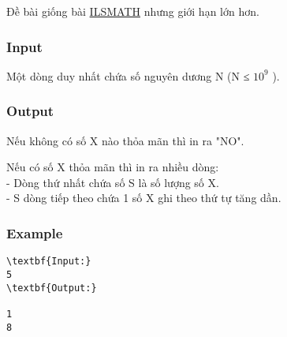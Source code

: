 

Đề bài giống bài \href{http://vnoi.info/problems/show/ILSMATH/}{ILSMATH} nhưng giới hạn lớn hơn.

\subsubsection{Input}

Một dòng duy nhất chứa số nguyên dương N (N ≤ $10^{9}$ ).

\subsubsection{Output}

Nếu không có số X nào thỏa mãn thì in ra "NO".

Nếu có số X thỏa mãn thì in ra nhiều dòng:
\\- Dòng thứ nhất chứa số S là số lượng số X.
\\- S dòng tiếp theo chứa 1 số X ghi theo thứ tự tăng dần.

\subsubsection{Example}
\begin{verbatim}
\textbf{Input:}
5
\textbf{Output:}

1
8\end{verbatim}
